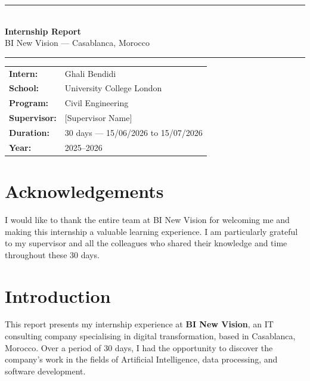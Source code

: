 \documentclass[12pt, a4paper]{article}
\begin{document}
\begin{titlepage}
\centering
\vspace*{4cm}

{\color{navyblue}\rule{\linewidth}{1.5pt}}\\[0.6cm]
{\Huge\bfseries\color{navyblue} Internship Report}\\[0.4cm]
{\large BI New Vision --- Casablanca, Morocco}\\[0.3cm]
{\color{navyblue}\rule{\linewidth}{1.5pt}}

\vspace{3cm}

\begin{tabular}{ll}
\textbf{Intern:}      & Ghali Bendidi \\[8pt]
\textbf{School:}      & University College London \\[8pt]
\textbf{Program:}     & Civil Engineering \\[8pt]
\textbf{Supervisor:}  & [Supervisor Name] \\[8pt]
\textbf{Duration:}    & 30 days --- 15/06/2026 to 15/07/2026 \\[8pt]
\textbf{Year:}        & 2025--2026 \\
\end{tabular}

\end{titlepage}

\newpage
\tableofcontents
\newpage

\section*{\color{navyblue} Acknowledgements}

I would like to thank the entire team at BI New Vision for welcoming me and making this internship a valuable learning experience. I am particularly grateful to my supervisor and all the colleagues who shared their knowledge and time throughout these 30 days.

\section*{\color{navyblue} Introduction}

This report presents my internship experience at \textbf{BI New Vision}, an IT consulting company specialising in digital transformation, based in Casablanca, Morocco. Over a period of 30 days, I had the opportunity to discover the company's work in the fields of Artificial Intelligence, data processing, and software development.
\end{document}
